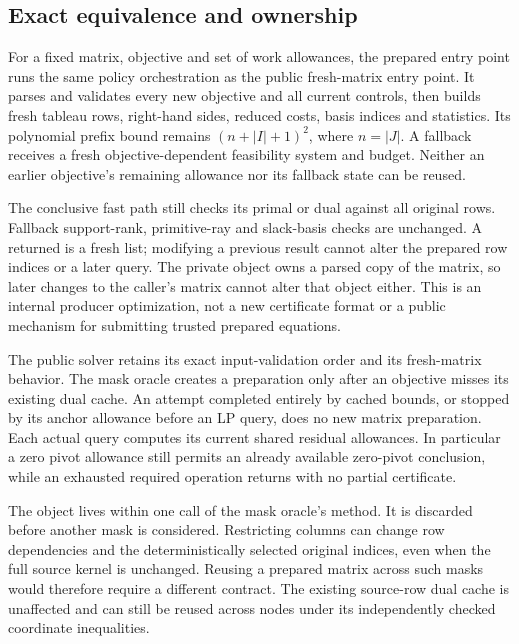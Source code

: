 \subsection{Exact equivalence and ownership}

For a fixed matrix, objective and set of work allowances, the prepared
entry point runs the same policy orchestration as the public fresh-matrix
entry point.  It parses and validates every new objective and all current
controls, then builds fresh tableau rows, right-hand sides, reduced costs,
basis indices and statistics.  Its polynomial prefix bound remains
$(n+|I|+1)^2$, where $n=|J|$.  A fallback receives a fresh objective-dependent
feasibility system and budget.  Neither an earlier objective's remaining
allowance nor its fallback state can be reused.

The conclusive fast path still checks its primal or dual against all
original rows.  Fallback support-rank, primitive-ray and slack-basis checks
are unchanged.  A returned  is a fresh list; modifying
a previous result cannot alter the prepared row indices or a later query.
The private object owns a parsed copy of the matrix, so later changes to
the caller's matrix cannot alter that object either.  This is an internal
producer optimization, not a new certificate format or a public mechanism
for submitting trusted prepared equations.

The public solver retains its exact input-validation order and its
fresh-matrix behavior.  The mask oracle creates a preparation only after
an objective misses its existing dual cache.  An attempt completed entirely
by cached bounds, or stopped by its anchor allowance before an LP query,
does no new matrix preparation.  Each actual query computes its current
shared residual allowances.  In particular a zero pivot allowance still
permits an already available zero-pivot conclusion, while an exhausted
required operation returns  with no partial certificate.

The object lives within one call of the mask oracle's  method.
It is discarded before another mask is considered.  Restricting columns
can change row dependencies and the deterministically selected original
indices, even when the full source kernel is unchanged.  Reusing a prepared
matrix across such masks would therefore require a different contract.
The existing source-row dual cache is unaffected and can still be reused
across nodes under its independently checked coordinate inequalities.


